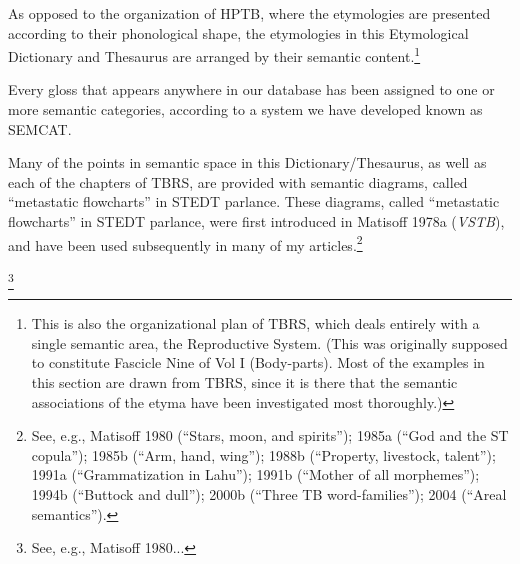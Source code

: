 As opposed to the organization of HPTB, where the etymologies are presented according to their phonological shape, the etymologies in this Etymological Dictionary and Thesaurus are arranged by their semantic content.\footnote{This is also the organizational plan of TBRS, which deals entirely with a single semantic area, the Reproductive System. (This was originally supposed to constitute Fascicle Nine of Vol I (Body-parts). Most of the examples in this section are drawn from TBRS, since it is there that the semantic associations of the etyma have been investigated most thoroughly.)}

 Every gloss that appears anywhere in our database has been assigned to one or more semantic categories, according to a system we have developed known as SEMCAT.

Many of the points in semantic space in this Dictionary/Thesaurus, as well as each of the chapters of TBRS, are provided with semantic diagrams, called “metastatic flowcharts” in STEDT parlance. These diagrams, called
“metastatic flowcharts” in STEDT parlance, were first introduced in Matisoff 1978a (\textit{VSTB}),
and have been used subsequently in many of my articles.\footnote{See, e.g.,
Matisoff 1980 (“Stars, moon, and spirits”); 1985a (“God and the ST copula”);
1985b (“Arm, hand, wing”); 1988b (“Property, livestock, talent”); 1991a
(“Grammatization in Lahu”); 1991b (“Mother of all morphemes”); 1994b (“Buttock
and dull”); 2000b (“Three TB word-families”); 2004 (“Areal semantics”).}

\footnote{See, e.g., Matisoff 1980...} 

